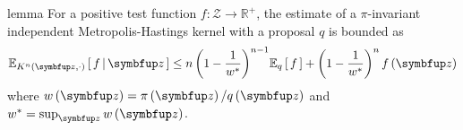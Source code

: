\begin{theoremEnd}{lemma}\label{thm:imh_expecation}
  For a positive test function \(f : \mathcal{Z} \rightarrow \mathbb{R}^{+}\), the estimate of a \(\pi\)-invariant independent Metropolis-Hastings kernel with a proposal \(q\) is bounded as
  \begin{align*}
    \Esub{K^n\left(\vz, \cdot\right)}{ f \,\middle|\, \vz }
    \leq
    n \, {\left(1 - \frac{1}{w^*}\right)}^{n-1} 
    \Esub{q}{f}
    +
    {\left(1 - \frac{1}{w^*}\right)}^n \, f\left(\vz\right)
  \end{align*}
  where \(w\left(\vz\right) = \pi\left(\vz\right) / q\left(\vz\right)\) and \(w^* = \sup_{\vz} w\left(\vz\right) \).
\end{theoremEnd}
